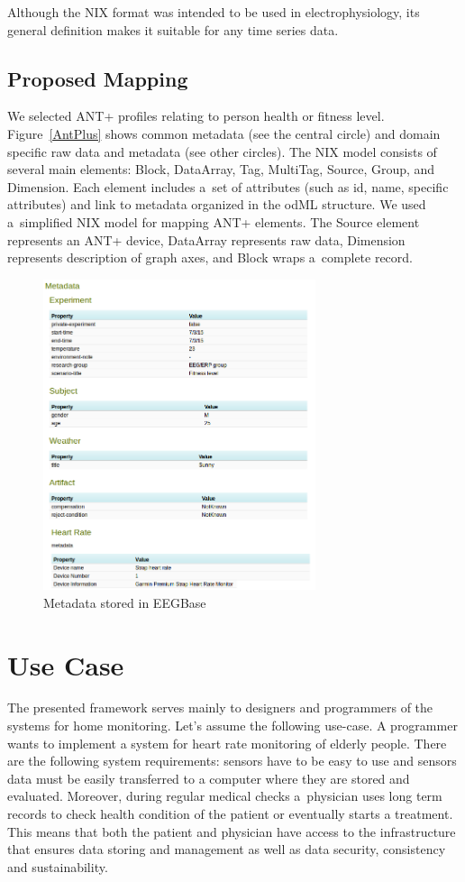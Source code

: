 \documentclass[conference]{IEEEtran}
\begin{document}
Although the NIX format was intended to be used in electrophysiology, its general definition makes it suitable for any time series data.


\subsection{Proposed Mapping}

We selected ANT+ profiles relating to person health or fitness level. Figure~\ref{AntPlus} shows common metadata (see the central circle) and domain specific raw data and metadata (see other circles). The NIX model consists of several main elements: Block, DataArray, Tag, MultiTag, Source, Group, and Dimension. Each element includes a~set of attributes (such as id, name, specific attributes) and link to metadata organized in the odML structure. We used a~simplified NIX model for mapping ANT+ elements. The Source element represents an ANT+ device, DataArray represents raw data, Dimension represents description of graph axes, and Block wraps a~complete record.

\begin{figure}
  \centering\includegraphics[width=8cm]{portal_example.png}
  \caption{Metadata stored in EEGBase}
  \label{fig:EEGBase}
 \end{figure}


\section{Use Case}\label{sec:use-case}

The presented framework serves mainly to designers and programmers of the systems for home monitoring. Let's assume the following use-case. A programmer wants to implement a system for heart rate monitoring of elderly people. There are the following system requirements: sensors have to be easy to use and  sensors data must be easily transferred to a computer where they are stored and evaluated. Moreover, during regular medical checks a~physician uses long term records to check health condition of the patient or eventually starts a treatment. This means that both the patient and physician have access to the infrastructure that ensures data storing and management as well as data security, consistency and sustainability.
\end{document}
